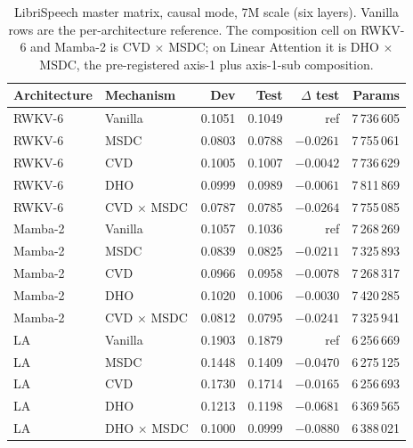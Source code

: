 \begin{table}[p]
\centering
\small
\caption[Master matrix on LibriSpeech, causal, 7M]{LibriSpeech master
matrix, causal mode, 7M scale (six layers). Vanilla rows are the
per-architecture reference. The composition cell on RWKV-6 and
Mamba-2 is CVD $\times$ MSDC; on Linear Attention it is
DHO $\times$ MSDC, the pre-registered axis-1 plus axis-1-sub
composition.}
\label{tab:results:master-matrix-causal-7m}
\setlength{\tabcolsep}{6pt}
\renewcommand{\arraystretch}{1.15}
\begin{tabularx}{\linewidth}{@{}p{2.0cm} X r r r r@{}}
\toprule
\textbf{Architecture} & \textbf{Mechanism} &
\textbf{Dev} & \textbf{Test} & \textbf{$\Delta$ test} & \textbf{Params} \\
\midrule
RWKV-6   & Vanilla         & 0.1051 & 0.1049 & ref       & 7\,736\,605 \\
RWKV-6   & MSDC            & 0.0803 & 0.0788 & $-0.0261$ & 7\,755\,061 \\
RWKV-6   & CVD             & 0.1005 & 0.1007 & $-0.0042$ & 7\,736\,629 \\
RWKV-6   & DHO             & 0.0999 & 0.0989 & $-0.0061$ & 7\,811\,869 \\
RWKV-6   & CVD $\times$ MSDC & 0.0787 & 0.0785 & $-0.0264$ & 7\,755\,085 \\
\addlinespace
Mamba-2  & Vanilla         & 0.1057 & 0.1036 & ref       & 7\,268\,269 \\
Mamba-2  & MSDC            & 0.0839 & 0.0825 & $-0.0211$ & 7\,325\,893 \\
Mamba-2  & CVD             & 0.0966 & 0.0958 & $-0.0078$ & 7\,268\,317 \\
Mamba-2  & DHO             & 0.1020 & 0.1006 & $-0.0030$ & 7\,420\,285 \\
Mamba-2  & CVD $\times$ MSDC & 0.0812 & 0.0795 & $-0.0241$ & 7\,325\,941 \\
\addlinespace
LA       & Vanilla         & 0.1903 & 0.1879 & ref       & 6\,256\,669 \\
LA       & MSDC            & 0.1448 & 0.1409 & $-0.0470$ & 6\,275\,125 \\
LA       & CVD             & 0.1730 & 0.1714 & $-0.0165$ & 6\,256\,693 \\
LA       & DHO             & 0.1213 & 0.1198 & $-0.0681$ & 6\,369\,565 \\
LA       & DHO $\times$ MSDC & 0.1000 & 0.0999 & $-0.0880$ & 6\,388\,021 \\
\bottomrule
\end{tabularx}
\end{table}

